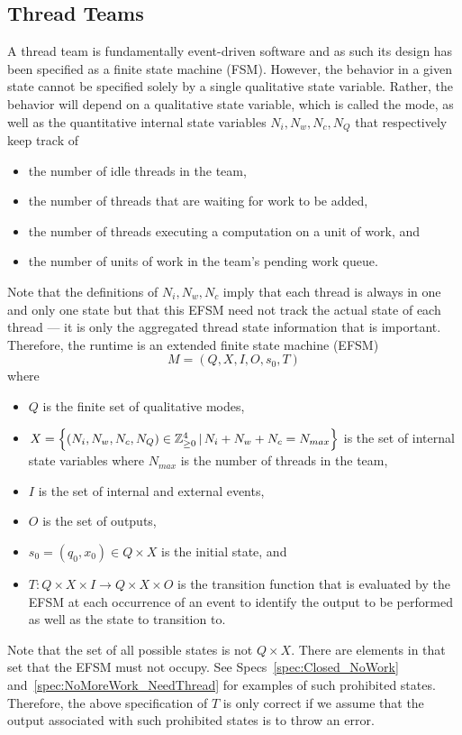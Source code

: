 \documentclass{article}
\newcommand{\Z}                 {{\mathbb Z}}
\begin{document}
\subsection{Thread Teams}
A thread team is fundamentally event-driven software and as such its design has
been specified as a finite state machine (FSM).  However, the behavior in a
given state cannot be specified solely by a single qualitative state variable.
Rather, the behavior will depend on a qualitative state variable, which is
called the mode, as well as the quantitative internal state variables $N_i, N_w,
N_c, N_Q$ that respectively keep track of 
\begin{itemize}
\item{the number of idle threads in the team,}
\item{the number of threads that are waiting for work to be added,}
\item{the number of threads executing a computation on a unit of work, and}
\item{the number of units of work in the team's pending work queue.}
\end{itemize}
Note that the definitions of $N_i, N_w, N_c$ imply that each thread is
always in one and only one state but that this EFSM need not track the actual
state of each thread --- it is only the aggregated thread state information that
is important.  Therefore, the runtime is an extended finite state machine (EFSM)
\[
M = (Q, X, I, O, s_0, T)
\]
where
\begin{itemize}
\item{$Q$ is the finite set of qualitative modes,}
\item{$X = \set{(N_i, N_w, N_c, N_Q) \in \Z_{\ge 0}^4\,|\,N_i + N_w + N_c =
N_{max}}$ is the set of internal state variables where $N_{max}$ is the
number of threads in the team,}
\item{$I$ is the set of internal and external events,}
\item{$O$ is the set of outputs,}
\item{$s_0 = (q_0, x_0) \in Q \times X$ is the initial state, and}
\item{$T : Q \times X \times I \to Q \times X \times O$ is the transition
function that is evaluated by the EFSM at each occurrence of an event to
identify the output to be performed as well as the state to transition to.}
\end{itemize}

Note that the set of all possible states is not $Q \times X$.  There are
elements in that set that the EFSM must not occupy.  See
Specs~\ref{spec:Closed_NoWork} and~\ref{spec:NoMoreWork_NeedThread} for examples of such
prohibited states.  Therefore, the above specification of $T$ is only correct
if we assume that the output associated with such prohibited states is to throw
an error.\\
\end{document}
